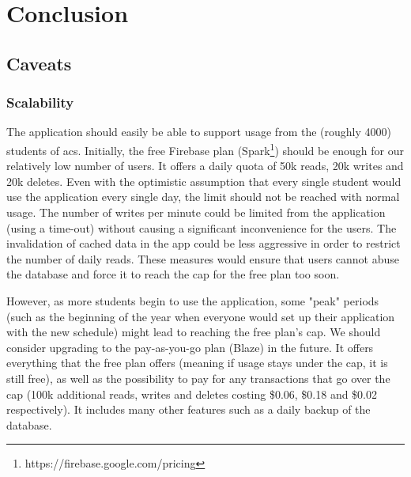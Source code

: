 \chapter{Conclusion} \label{chapter6}

\section{Caveats} \label{6:caveats}

\subsection{Scalability} \label{6:scalability}

The application should easily be able to support usage from the (roughly 4000) students of \acrshort{acs}. Initially, the free Firebase plan (Spark\footnote{https://firebase.google.com/pricing}) should be enough for our relatively low number of users. It offers a daily quota of 50k reads, 20k writes and 20k deletes. Even with the optimistic assumption that every single student would use the application every single day, the limit should not be reached with normal usage. The number of writes per minute could be limited from the application (using a time-out) without causing a significant inconvenience for the users. The invalidation of cached data in the app could be less aggressive in order to restrict the number of daily reads. These measures would ensure that users cannot abuse the database and force it to reach the cap for the free plan too soon.

However, as more students begin to use the application, some "peak" periods (such as the beginning of the year when everyone would set up their application with the new schedule) might lead to reaching the free plan's cap. We should consider upgrading to the pay-as-you-go plan (Blaze\footnotemark[1]) in the future. It offers everything that the free plan offers (meaning if usage stays under the cap, it is still free), as well as the possibility to pay for any transactions that go over the cap (100k additional reads, writes and deletes costing \$0.06, \$0.18 and \$0.02 respectively). It includes many other features such as a daily backup of the database.

